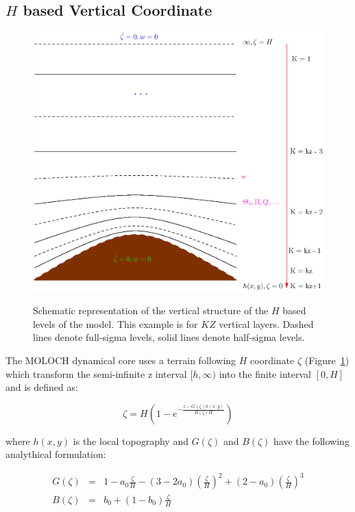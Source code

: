 \subsection{$H$ based Vertical Coordinate}
\label{h_coordinate}

\begin{figure}
\begin{center}
\resizebox{3.5in}{!}
{\includegraphics{moloch_levels.eps}}
\caption{Schematic representation of the vertical structure of the $H$
based levels of the model.
This example is for $KZ$ vertical layers. Dashed lines denote full-sigma levels,
solid lines denote half-sigma levels.}
\label{moloch_levels}
\end{center}
\end{figure}

The \ac{MOLOCH} dynamical core uses a terrain following $H$ coordinate
$\zeta$ (Figure~\ref{moloch_levels}) which transform the semi-infinite z
interval $[h, \infty)$ into the finite interval $[0,H]$ and is defined as:

\begin{equation}
\zeta = H \left( 1 - e^{-\frac{z - G(\zeta)h(x,y)}{B(\zeta) H}} \right)
\end{equation}

where $h(x,y)$ is the local topography and $G(\zeta)$ and $B(\zeta)$ have the
following analythical formulation:

\begin{eqnarray}
G(\zeta) &=& 1 - a_0 \frac{\zeta}{H} -
       (3 - 2 a_0)\left( \frac{\zeta}{H} \right)^2 +
       (2 - a_0) \left( \frac{\zeta}{H} \right)^3 \\
B(\zeta) &=& b_0 + (1-b_0) \frac{\zeta}{H}
\end{eqnarray}

